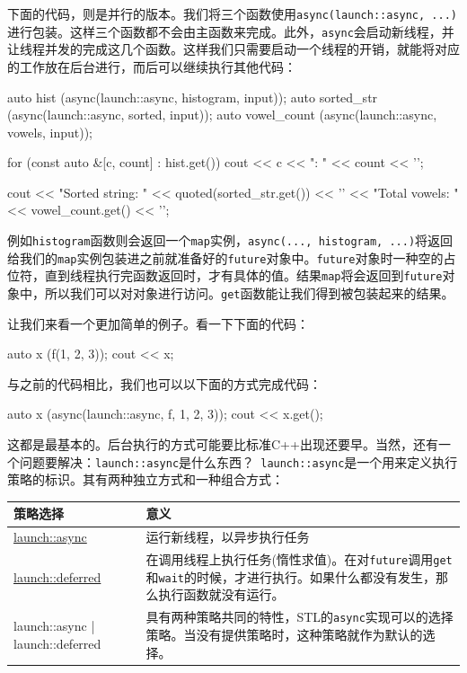下面的代码，则是并行的版本。我们将三个函数使用\texttt{async(launch::async, ...)}进行包装。这样三个函数都不会由主函数来完成。此外，\texttt{async}会启动新线程，并让线程并发的完成这几个函数。这样我们只需要启动一个线程的开销，就能将对应的工作放在后台进行，而后可以继续执行其他代码：

\begin{codebox}[cpp]
auto hist (async(launch::async, histogram, input));
auto sorted_str (async(launch::async, sorted, input));
auto vowel_count (async(launch::async, vowels, input));

for (const auto &[c, count] : hist.get()) {
    cout << c << ": " << count << '\n';
}

cout << "Sorted string: "
    << quoted(sorted_str.get()) << '\n'
    << "Total vowels: "
    << vowel_count.get() << '\n';
\end{codebox}

例如\texttt{histogram}函数则会返回一个\texttt{map}实例，\texttt{async(..., histogram, ...)}将返回给我们的\texttt{map}实例包装进之前就准备好的\texttt{future}对象中。\texttt{future}对象时一种空的占位符，直到线程执行完函数返回时，才有具体的值。结果\texttt{map}将会返回到\texttt{future}对象中，所以我们可以对对象进行访问。\texttt{get}函数能让我们得到被包装起来的结果。

让我们来看一个更加简单的例子。看一下下面的代码：

\begin{codebox}[cpp]
auto x (f(1, 2, 3));
cout << x;
\end{codebox}

与之前的代码相比，我们也可以以下面的方式完成代码：

\begin{codebox}[cpp]
auto x (async(launch::async, f, 1, 2, 3));
cout << x.get();
\end{codebox}

这都是最基本的。后台执行的方式可能要比标准C++出现还要早。当然，还有一个问题要解决：\texttt{launch::async}是什么东西？\texttt{ launch::async}是一个用来定义执行策略的标识。其有两种独立方式和一种组合方式：

\begin{table}[htbp]\centering
\begin{tabularx}{\textwidth}{XX}
\toprule
策略选择 & 意义 \\
\midrule
\href{http://zh.cppreference.com/w/cpp/thread/launch}{launch::async} & 运行新线程，以异步执行任务 \\
\href{http://zh.cppreference.com/w/cpp/thread/launch}{launch::deferred} & 在调用线程上执行任务(惰性求值)。在对\texttt{future}调用\texttt{get}和\texttt{wait}的时候，才进行执行。如果什么都没有发生，那么执行函数就没有运行。 \\
launch::async | launch::deferred & 具有两种策略共同的特性，STL的\texttt{async}实现可以的选择策略。当没有提供策略时，这种策略就作为默认的选择。 \\
\bottomrule
\end{tabularx}
\end{table}


